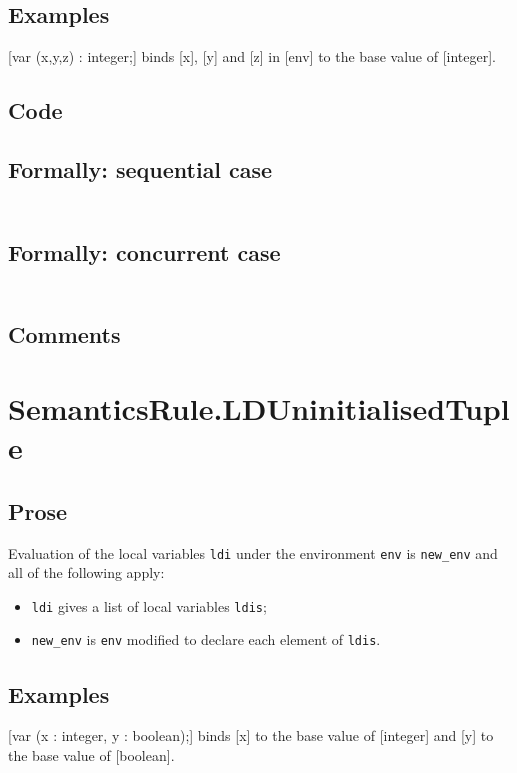 \documentclass{book}
\begin{document}
    \subsection{Examples}
    [var (x,y,z) : integer;] binds [x], [y] and [z] in [env] to the base value
    of [integer].

  \subsection{Code}

  \subsection{Formally: sequential case}
  \begin{align}
  \end{align} 

  \subsection{Formally: concurrent case}
  \begin{align}
  \end{align} 

    \subsection{Comments}

\section{SemanticsRule.LDUninitialisedTuple \label{sec:SemanticsRule.LDUninitialisedTuple}}

    \subsection{Prose}
Evaluation of the local variables \texttt{ldi} under the environment
\texttt{env} is \texttt{new\_env} and all of the following apply:
    \begin{itemize}
    \item \texttt{ldi} gives a list of local variables \texttt{ldis};
    \item \texttt{new\_env} is \texttt{env} modified to declare each element of \texttt{ldis}.
    \end{itemize}

    \subsection{Examples}
    [var (x : integer, y : boolean);] binds [x] to the base value of [integer]
    and [y] to the base value of [boolean].
\end{document}
